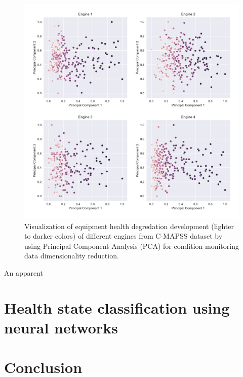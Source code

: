 \begin{figure}[H]
    \centering
    \includegraphics[width=\linewidth]{figures/plots/pc-degradation.pdf}
    \caption{Visualization of equipment health degredation development (lighter to darker colors) of different engines from C-MAPSS dataset by using Principal Component Analysis (PCA) for condition monitoring data dimensionality reduction.}
    \label{fig:pca-degradation}
\end{figure}

An apparent 

\section{Health state classification using neural networks}

\section{Conclusion}
